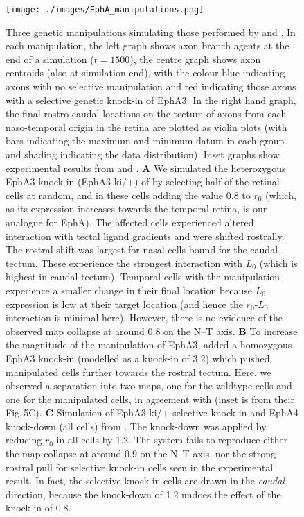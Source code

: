 \documentclass[11pt, a4paper]{article}
\begin{document}
\begin{figure}
\label{f:GJsurg}
\end{figure}

\begin{figure}
\texttt{[image: ./images/EphA\_manipulations.png]}
\caption{Three genetic manipulations simulating those performed by \citet{brown_topographic_2000} and \citet{reber_relative_2004}. In each manipulation, the left graph shows axon branch agents at the end of a simulation ($t=1500$), the centre graph shows axon centroids (also at simulation end), with the colour blue indicating axons with no selective manipulation and red indicating those axons with a selective genetic knock-in of EphA3. In the right hand graph, the final rostro-caudal locations on the tectum of axons from each naso-temporal origin in the retina are plotted as violin plots (with bars indicating the maximum and minimum datum in each group and shading indicating the data distribution). Inset graphs show experimental results from  \citet{brown_topographic_2000} and \citet{reber_relative_2004}. \textbf{A} We simulated the heterozygous EphA3 knock-in (EphA3 ki/+) of \citet{brown_topographic_2000} by selecting half of the retinal cells at random, and in these cells adding the value 0.8 to $r_0$ (which, as its expression increases towards the temporal retina, is our analogue for EphA). The affected cells experienced altered interaction with tectal ligand gradients and were shifted rostrally. The rostral shift was largest for nasal cells bound for the caudal tectum. These experience the strongest interaction with $L_0$ (which is highest in caudal tectum). Temporal cells with the manipulation experience a smaller change in their final location because $L_0$ expression is low at their target location (and hence the $r_0$-$L_0$ interaction is minimal here). However, there is no evidence of the observed map collapse at around 0.8 on the N--T axis. \textbf{B} To increase the magnitude of the manipulation of EphA3, \citet{brown_topographic_2000} added a homozygous EphA3 knock-in (modelled as a knock-in of 3.2) which pushed manipulated cells further towards the rostral tectum. Here, we observed a separation into two maps, one for the wildtype cells and one for the manipulated cells, in agreement with \citet{brown_topographic_2000} (inset is from their Fig.\,5C). \textbf{C} Simulation of EphA3 ki/+ selective knock-in and EphA4 knock-down (all cells) from \citet{reber_relative_2004}. The knock-down was applied by reducing $r_0$ in all cells by 1.2. The system fails to reproduce either the map collapse at around 0.9 on the N--T axis, nor the strong rostral pull for selective knock-in cells seen in the experimental result. In fact, the selective knock-in cells are drawn in the \emph{caudal} direction, because the knock-down of 1.2 undoes the effect of the knock-in of 0.8.}
\label{f:GJeph}
\end{figure}
\end{document}
